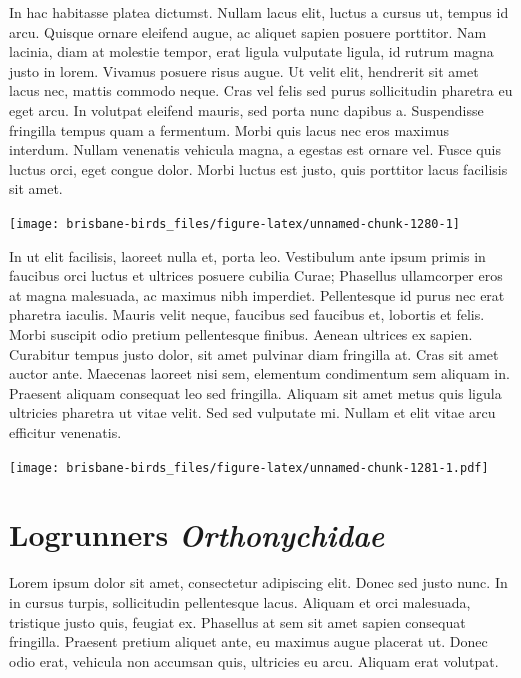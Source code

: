 \documentclass[]{book}
\let\origfigure\figure
\let\endorigfigure\endfigure
\renewenvironment{figure}[1][2] {
  \expandafter\origfigure\expandafter[H]
} {
  \endorigfigure
}
\begin{document}
In hac habitasse platea dictumst. Nullam lacus elit, luctus a cursus ut,
tempus id arcu. Quisque ornare eleifend augue, ac aliquet sapien posuere
porttitor. Nam lacinia, diam at molestie tempor, erat ligula vulputate
ligula, id rutrum magna justo in lorem. Vivamus posuere risus augue. Ut
velit elit, hendrerit sit amet lacus nec, mattis commodo neque. Cras vel
felis sed purus sollicitudin pharetra eu eget arcu. In volutpat eleifend
mauris, sed porta nunc dapibus a. Suspendisse fringilla tempus quam a
fermentum. Morbi quis lacus nec eros maximus interdum. Nullam venenatis
vehicula magna, a egestas est ornare vel. Fusce quis luctus orci, eget
congue dolor. Morbi luctus est justo, quis porttitor lacus facilisis sit
amet.

\begin{figure}
\texttt{[image: brisbane-birds\_files/figure-latex/unnamed-chunk-1280-1]} \caption{insert figure caption}\label{fig:unnamed-chunk-1280}
\end{figure}

In ut elit facilisis, laoreet nulla et, porta leo. Vestibulum ante ipsum
primis in faucibus orci luctus et ultrices posuere cubilia Curae;
Phasellus ullamcorper eros at magna malesuada, ac maximus nibh
imperdiet. Pellentesque id purus nec erat pharetra iaculis. Mauris velit
neque, faucibus sed faucibus et, lobortis et felis. Morbi suscipit odio
pretium pellentesque finibus. Aenean ultrices ex sapien. Curabitur
tempus justo dolor, sit amet pulvinar diam fringilla at. Cras sit amet
auctor ante. Maecenas laoreet nisi sem, elementum condimentum sem
aliquam in. Praesent aliquam consequat leo sed fringilla. Aliquam sit
amet metus quis ligula ultricies pharetra ut vitae velit. Sed sed
vulputate mi. Nullam et elit vitae arcu efficitur venenatis.

\begin{figure}
\centering
\texttt{[image: brisbane-birds\_files/figure-latex/unnamed-chunk-1281-1.pdf]}
\caption{\label{fig:unnamed-chunk-1281}insert figure caption}
\end{figure}

\chapter{\texorpdfstring{Logrunners
\emph{Orthonychidae}}{Logrunners Orthonychidae}}\label{logrunners-orthonychidae}

Lorem ipsum dolor sit amet, consectetur adipiscing elit. Donec sed justo
nunc. In in cursus turpis, sollicitudin pellentesque lacus. Aliquam et
orci malesuada, tristique justo quis, feugiat ex. Phasellus at sem sit
amet sapien consequat fringilla. Praesent pretium aliquet ante, eu
maximus augue placerat ut. Donec odio erat, vehicula non accumsan quis,
ultricies eu arcu. Aliquam erat volutpat.
\end{document}
